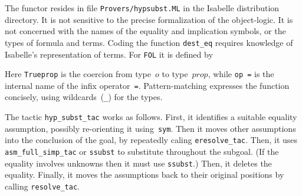 %
The functor resides in file {\tt Provers/hypsubst.ML} in the Isabelle
distribution directory.  It is not sensitive to the precise formalization
of the object-logic.  It is not concerned with the names of the equality
and implication symbols, or the types of formula and terms.  Coding the
function {\tt dest_eq} requires knowledge of Isabelle's representation of
terms.  For {\tt FOL} it is defined by
Here {\tt Trueprop} is the coercion from type~$o$ to type~$prop$, while
\hbox{\tt op =} is the internal name of the infix operator~{\tt=}.
Pattern-matching expresses the function concisely, using wildcards~({\tt_})
for the types.

The tactic {\tt hyp_subst_tac} works as follows.  First, it identifies a
suitable equality assumption, possibly re-orienting it using~{\tt sym}.  Then
it moves other assumptions into the conclusion of the goal, by repeatedly
caling {\tt eresolve_tac\ts[rev_mp]}.  Then, it uses {\tt asm_full_simp_tac}
or {\tt ssubst} to substitute throughout the subgoal.  (If the equality
involves unknowns then it must use {\tt ssubst}.)  Then, it deletes the
equality.  Finally, it moves the assumptions back to their original positions
by calling \hbox{\tt resolve_tac}.


